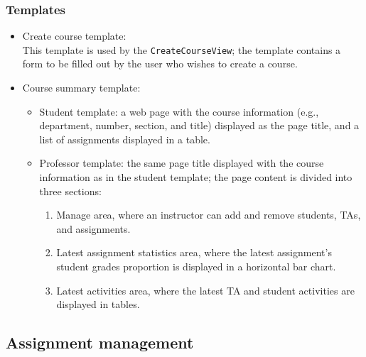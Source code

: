 \subsubsection{Templates}
\begin{itemize}
    \item Create course template: \\
        This template is used by the \texttt{CreateCourseView}; the template
        contains a form to be filled out by the user who
        wishes to create a course. 
    \item Course summary template:
    \begin{itemize}
        \item Student template: a web page with the course information
            (e.g., department, number, section, and title)
            displayed as the page title, and a list of assignments displayed
            in a table.
        \item Professor template: the same page title displayed with the course
            information as in the student template;
            the page content is divided into three sections:
            \begin{enumerate}
                \item Manage area, where an instructor can add and remove
                    students, TAs, and assignments.
                \item Latest assignment statistics area, where the latest
                    assignment's student grades proportion is displayed
                    in a horizontal bar chart.
                \item Latest activities area, where the latest TA and student
                    activities are displayed in tables.
            \end{enumerate}
    \end{itemize}
\end{itemize}

\FloatBarrier





\subsection{Assignment management}
\label{sec:ASM_MAN}

